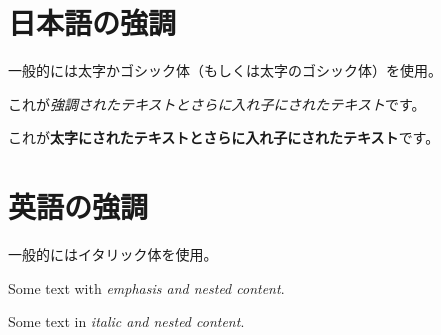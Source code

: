 \documentclass[dvipdfmx]{jlreq}
\begin{document}
\section{日本語の強調}
一般的には太字かゴシック体（もしくは太字のゴシック体）を使用。

これが\emph{強調されたテキストと\emph{さらに入れ子にされたテキスト}}です。

これが\textbf{太字にされたテキストと\textbf{さらに入れ子にされたテキスト}}です。

\section{英語の強調}
一般的にはイタリック体を使用。

Some text with \emph{emphasis and \emph{nested} content}.

Some text in \textit{italic and \textit{nested} content}.
\end{document}

